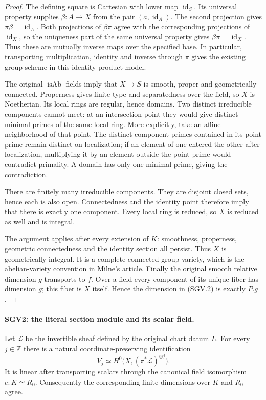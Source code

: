 \begin{proof}
The defining square is Cartesian with lower map
$\operatorname{id}_S$.  Its universal property supplies
$\beta:A\to X$ from the pair $(a,\operatorname{id}_A)$.
The second projection gives $\pi\beta=\operatorname{id}_A$.
Both projections of $\beta\pi$ agree with the corresponding
projections of $\operatorname{id}_X$, so the uniqueness part of the
same universal property gives $\beta\pi=\operatorname{id}_X$.
Thus these are mutually inverse maps over the specified base.  In
particular, transporting multiplication, identity and inverse through
$\pi$ gives the existing group scheme in this identity-product model.

The original $\operatorname{isAb}$ fields imply that $X\to S$ is
smooth, proper and geometrically connected.  Properness gives finite
type and separatedness over the field, so $X$ is Noetherian.  Its local
rings are regular, hence domains.  Two distinct irreducible components
cannot meet: at an intersection point they would give distinct
minimal primes of the same local ring.  More explicitly, take an
affine neighborhood of that point.  The distinct component primes
contained in its point prime remain distinct on localization; if an
element of one entered the other after localization, multiplying it
by an element outside the point prime would contradict primality.
A domain has only one minimal prime, giving the contradiction.

There are finitely many irreducible components.  They are disjoint
closed sets, hence each is also open.  Connectedness and the identity
point therefore imply that there is exactly one component.  Every
local ring is reduced, so $X$ is reduced as well and is integral.

The argument applies after every extension of $K$: smoothness,
properness, geometric connectedness and the identity section all
persist.  Thus $X$ is geometrically integral.  It is a complete
connected group variety, which is the abelian-variety convention in
Milne's article.  Finally the original smooth relative dimension $g$
transports to $f$.  Over a field every component of its unique fiber
has dimension $g$; this fiber is $X$ itself.  Hence the dimension in
(SGV.2) is exactly $P.g$.
\end{proof}

\paragraph{SGV2: the literal section module and its scalar field.}
\label{claim:SGV2}
Let $\mathcal L$ be the invertible sheaf defined by the original
chart datum $L$.  For every $j\in\mathbb Z$ there is a natural
coordinate-preserving identification
\[
 V_j\simeq H^0\bigl(X,(\pi^*\mathcal L)^{\otimes j}\bigr).
                                                        \tag{SGV.3}
\]
It is linear after transporting scalars through the canonical field
isomorphism $e:K\simeq R_0$.  Consequently the corresponding finite
dimensions over $K$ and $R_0$ agree.


